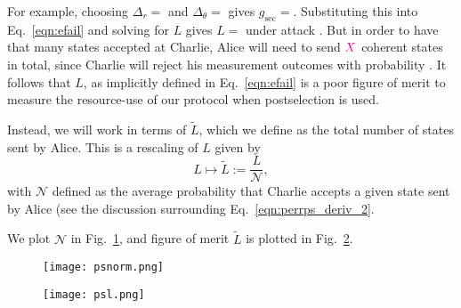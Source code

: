 For example, choosing $\Delta_r = $ and $\Delta_\theta = $ gives $g_{\text{sec}} = $. Substituting this into Eq.~\ref{eqn:efail} and solving for $L$ gives $L = $ under attack . But in order to have that many states accepted at Charlie, Alice will need to send $\textcolor{magenta}{X}$ coherent states in total, since Charlie will reject his measurement outcomes with probability . It follows that $L$, as implicitly defined in Eq.~\ref{eqn:efail} is a poor figure of merit to measure the resource-use of our protocol when postselection is used.

Instead, we will work in terms of $\tilde{L}$, which we define as the total number of states sent by Alice. This is a rescaling of $L$ given by
\begin{equation}
L \mapsto \tilde{L} := \frac{L}{\mathcal{N}},
\end{equation}
with $\mathcal{N}$ defined as the average probability that Charlie accepts a given state sent by Alice (see the discussion surrounding Eq.~\ref{eqn:perrps_deriv_2}. 

We plot $\mathcal{N}$ in Fig.~\ref{fig:psnorm}, and figure of merit $\tilde{L}$ is plotted in Fig.~\ref{fig:psl}.  

\begin{figure}[htp]
\centering
\texttt{[image: psnorm.png]}
\caption{\label{fig:psnorm}}
\end{figure}

\begin{figure}[htp]
\centering
\texttt{[image: psl.png]}
\caption{\label{fig:psl}}
\end{figure}











